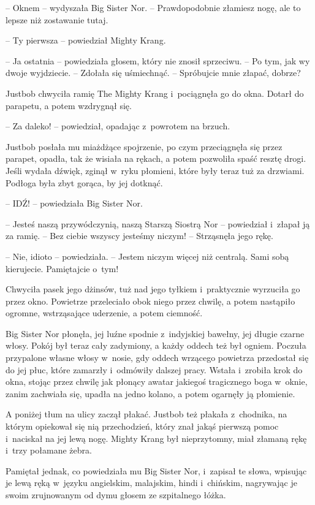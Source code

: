 \documentclass[oneside,polish,11pt,rmheadings]{mwbk}
\begin{document}
-- Oknem -- wydyszała Big Sister Nor. -- Prawdopodobnie złamiesz nogę, ale to lepsze niż zostawanie tutaj. 

-- Ty pierwsza -- powiedział Mighty Krang.

-- Ja ostatnia -- powiedziała głosem, który nie znosił sprzeciwu. -- Po tym, jak wy dwoje wyjdziecie. -- Zdołała się uśmiechnąć. -- Spróbujcie mnie złapać, dobrze? 

Justbob chwyciła ramię The Mighty Krang i~pociągnęła go do okna. Dotarł do parapetu, a potem wzdrygnął się. 

-- Za daleko! -- powiedział, opadając z~powrotem na brzuch. 

Justbob posłała mu miażdżące spojrzenie, po czym przeciągnęła się przez parapet, opadła, tak że wisiała na rękach, a potem pozwoliła spaść resztę drogi. Jeśli wydała dźwięk, zginął w~ryku płomieni, które były teraz tuż za drzwiami. Podłoga była zbyt gorąca, by jej dotknąć.

-- IDŹ! -- powiedziała Big Sister Nor.

-- Jesteś naszą przywódczynią, naszą Starszą Siostrą Nor -- powiedział i~złapał ją za ramię. -- Bez ciebie wszyscy jesteśmy niczym! -- Strząsnęła jego rękę.

-- Nie, idioto -- powiedziała. -- Jestem niczym więcej niż centralą. Sami sobą kierujecie. Pamiętajcie o~tym! 

Chwyciła pasek jego dżinsów, tuż nad jego tyłkiem i~praktycznie wyrzuciła go przez okno. Powietrze przeleciało obok niego przez chwilę, a potem nastąpiło ogromne, wstrząsające uderzenie, a potem ciemność.

Big Sister Nor płonęła, jej luźne spodnie z~indyjskiej bawełny, jej długie czarne włosy. Pokój był teraz cały zadymiony, a każdy oddech też był ogniem. Poczuła przypalone własne włosy w~nosie, gdy oddech wrzącego powietrza przedostał się do jej płuc, które zamarzły i~odmówiły dalszej pracy. Wstała i~zrobiła krok do okna, stojąc przez chwilę jak płonący awatar jakiegoś tragicznego boga w~oknie, zanim zachwiała się, upadła na jedno kolano, a potem ogarnęły ją płomienie.

A poniżej tłum na ulicy zaczął płakać. Justbob też płakała z~chodnika, na którym opiekował się nią przechodzień, który znał jakąś pierwszą pomoc i~naciskał na jej lewą nogę. Mighty Krang był nieprzytomny, miał złamaną rękę i~trzy połamane żebra.

Pamiętał jednak, co powiedziała mu Big Sister Nor, i~zapisał te słowa, wpisując je lewą ręką w~języku angielskim, malajskim, hindi i~chińskim, nagrywając je swoim zrujnowanym od dymu głosem ze szpitalnego łóżka.
\end{document}
